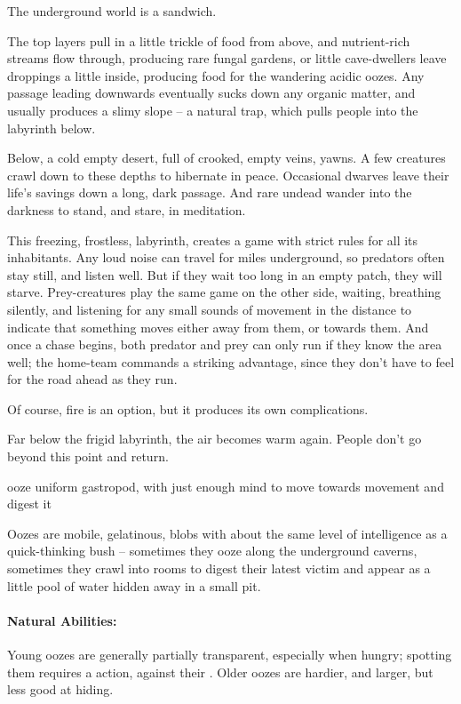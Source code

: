 \begin{multicols}{2}

\noindent
The underground world is a sandwich.

The top layers pull in a little trickle of food from above, and nutrient-rich streams flow through, producing rare fungal gardens, or little cave-dwellers leave droppings a little inside, producing food for the wandering acidic oozes.
Any passage leading downwards eventually sucks down any organic matter, and usually produces a slimy slope -- a natural trap, which pulls people into the labyrinth below.

Below, a cold empty desert, full of crooked, empty veins, yawns.
A few creatures crawl down to these depths to hibernate in peace.
Occasional dwarves leave their life's savings down a long, dark passage.
And rare undead wander into the darkness to stand, and stare, in meditation.

This freezing, frostless, labyrinth, creates a game with strict rules for all its inhabitants.
Any loud noise can travel for miles underground, so predators often stay still, and listen well.
But if they wait too long in an empty patch, they will starve.
Prey-creatures play the same game on the other side, waiting, breathing silently, and listening for any small sounds of movement in the distance to indicate that something moves either away from them, or towards them.
And once a chase begins, both predator and prey can only run if they know the area well; the home-team commands a striking advantage, since they don't have to feel for the road ahead as they run.

Of course, fire is an option, but it produces its own complications.

Far below the frigid labyrinth, the air becomes warm again.
People don't go beyond this point and return.

  {ooze}%
  {uniform gastropod, with just enough mind to move towards movement and digest it}%


Oozes are mobile, gelatinous, blobs with about the same level of intelligence as a quick-thinking bush -- sometimes they ooze along the underground caverns, sometimes they crawl into rooms to digest their latest victim and appear as a little pool of water hidden away in a small pit.

\paragraph{Natural Abilities:} Young oozes are generally partially transparent, especially when hungry; spotting them requires a  action, against their .
Older oozes are hardier, and larger, but less good at hiding.


\end{multicols}
